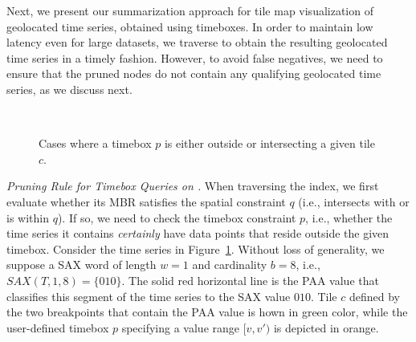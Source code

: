 Next, we present our summarization approach for tile map visualization of geolocated time series, obtained using timeboxes. In order to maintain low latency even for large datasets, we traverse \hisax to obtain the resulting geolocated time series in a timely fashion. However, to avoid false negatives, we need to ensure that the pruned nodes do not contain any qualifying geolocated time series, as we discuss next. 

\begin{figure}[!t]
 \centering
 \
\caption{Cases where a timebox $p$ is either outside or intersecting a given tile $c$.}
\label{fig:br_outside}
\end{figure}

\vspace{3mm}

\emph{Pruning Rule for Timebox Queries on \hisax.}
When traversing the \hisax index, we first evaluate whether its MBR satisfies the spatial constraint $q$ (i.e., intersects with or is within $q$). If so, we need to check the timebox constraint $p$, i.e., whether the time series it contains {\em certainly} have data points that reside outside the given timebox. Consider the time series in Figure~\ref{fig:br_outside}. Without loss of generality, we suppose a SAX word of length $w=1$ and cardinality $b=8$, i.e., $SAX(T,1,8)=\{010\}$. The solid red horizontal line is the PAA value that classifies this segment of the time series to the SAX value $010$. Tile $c$ defined by the two breakpoints that contain the PAA value is hown in green color, while the user-defined timebox $p$ specifying a value range $[v,v')$ is depicted in orange.


